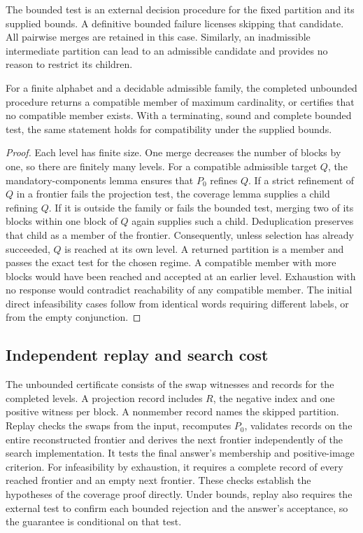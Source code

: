 The bounded test is an external decision procedure for the fixed
partition and its supplied bounds. A definitive bounded failure licenses
skipping that candidate. All pairwise merges are retained in this case.
Similarly, an inadmissible intermediate partition can lead to an
admissible candidate and provides no reason to restrict its children.

\begin{theorem}
For a finite alphabet and a decidable admissible family, the completed
unbounded procedure returns a compatible member of maximum cardinality,
or certifies that no compatible member exists. With a terminating,
sound and complete bounded test, the same statement holds for
compatibility under the supplied bounds.
\end{theorem}
\begin{proof}
Each level has finite size. One merge decreases the number of blocks
by one, so there are finitely many levels. For a compatible admissible
target \(Q\), the mandatory-components lemma ensures that \(P_0\)
refines \(Q\). If a strict refinement of \(Q\) in a frontier fails
the projection test, the coverage lemma supplies a child refining
\(Q\). If it is outside the family or fails the bounded test, merging
two of its blocks within one block of \(Q\) again supplies such a child.
Deduplication preserves that child as a member of the frontier.
Consequently, unless selection has already succeeded, \(Q\) is reached
at its own level. A returned partition is a member and passes the exact
test for the chosen regime. A compatible member with more blocks would
have been reached and accepted at an earlier level. Exhaustion with no
response would contradict reachability of any compatible member.
The initial direct infeasibility cases follow from identical words
requiring different labels, or from the empty conjunction.
\end{proof}

\subsection{Independent replay and search cost}

The unbounded certificate consists of the swap witnesses and records
for the completed levels. A projection record includes \(R\), the
negative index and one positive witness per block. A nonmember record
names the skipped partition. Replay checks the swaps from the input,
recomputes \(P_0\), validates records on the entire reconstructed frontier
and derives the next frontier independently of the search implementation.
It tests the final answer's membership and positive-image criterion.
For infeasibility by exhaustion, it requires a complete record of every
reached frontier and an empty next frontier. These checks establish the
hypotheses of the coverage proof directly. Under bounds, replay also
requires the external test to confirm each bounded rejection and the
answer's acceptance, so the guarantee is conditional on that test.

